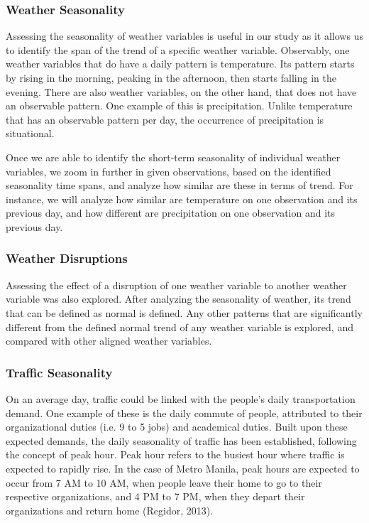\subsubsection{Weather Seasonality}
Assessing the seasonality of weather variables is useful in our study as it allows us to identify the span of the trend of a specific weather variable. Observably, one weather variables that do have a daily pattern is temperature. Its pattern starts by rising in the morning, peaking in the afternoon, then starts falling in the evening. There are also weather variables, on the other hand, that does not have an observable pattern. One example of this is precipitation. Unlike temperature that has an observable pattern per day, the occurrence of precipitation is situational. 

Once we are able to identify the short-term seasonality of individual weather variables, we zoom in further in given observations, based on the identified seasonality time spans, and analyze how similar are these in terms of trend. For instance, we will analyze how similar are temperature on one observation and its previous day, and how different are precipitation on one observation and its previous day.

\subsubsection{Weather Disruptions}
Assessing the effect of a disruption of one weather variable to another weather variable was also explored. After analyzing the seasonality of weather, its trend that can be defined as normal is defined. Any other patterns that are significantly different from the defined normal trend of any weather variable is explored, and compared with other aligned weather variables. 

\subsubsection{Traffic Seasonality}
On an average day, traffic could be linked with the people's daily transportation demand. One example of these is the daily commute of people, attributed to their organizational duties (i.e. 9 to 5 jobs) and academical duties. Built upon these expected demands, the daily seasonality of traffic has been established, following the concept of peak hour. Peak hour refers to the busiest hour where traffic is expected to rapidly rise. In the case of Metro Manila, peak hours are expected to occur from 7 AM to 10 AM, when people leave their home to go to their respective organizations, and 4 PM to 7 PM, when they depart their organizations and return home (Regidor, 2013).

